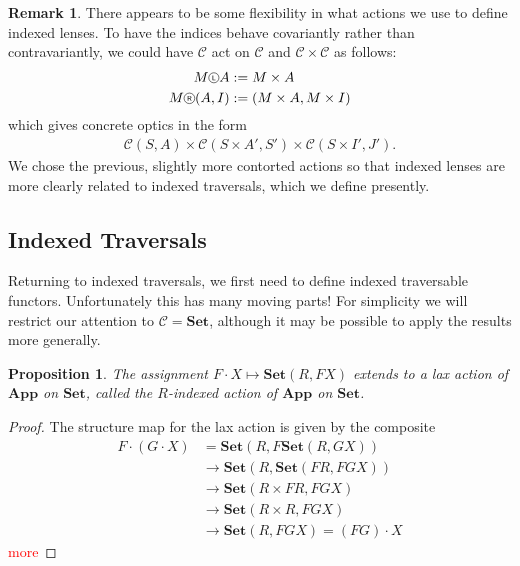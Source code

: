 \documentclass[11pt,letterpaper]{article}
\theoremstyle{plain}
\newtheorem{proposition}[theorem]{Proposition}
\theoremstyle{definition}
\newtheorem{remark}[theorem]{Remark}
\newcommand{\C}{\mathscr{C}}
\newcommand{\Set}{\mathbf{Set}}
\newcommand{\App}{\mathbf{App}}
\newcommand{\Optic}{\mathbf{Optic}}
\newcommand{\act}{\cdot}
\newcommand*\circled[1]{\tikz[baseline={([yshift=-0.65ex]current bounding box.center)}]{
   \node[shape=circle,draw,inner sep=1pt] (char) {#1};}}
\newcommand{\actL}{{\circled{\tiny$\mathsf{L}$}}}
\newcommand{\actR}{{\circled{\tiny$\mathsf{R}$}}}
\newcommand{\todo}[1]{\textcolor{red}{\small #1}}
\begin{document}
\begin{remark}
There appears to be some flexibility in what actions we use to define indexed lenses. To have the indices behave covariantly rather than contravariantly, we could have $\C$ act on $\C$ and $\C \times \C$ as follows:
\begin{align*}
M \actL A &:= M \times A \\
M \actR (A, I) &:= (M \times A, M \times I)
\end{align*}
which gives concrete optics in the form
\begin{align*}
\C(S, A) \times \C(S \times A', S') \times \C(S \times I', J').
\end{align*}
We chose the previous, slightly more contorted actions so that indexed lenses are more clearly related to indexed traversals, which we define presently.
\end{remark}

\subsection{Indexed Traversals}

Returning to indexed traversals, we first need to define indexed traversable functors. Unfortunately this has many moving parts! For simplicity we will restrict our attention to $\C = \Set$, although it may be possible to apply the results more generally.

\begin{proposition}
The assignment $F \act X \mapsto \Set(R, FX)$ extends to a lax action of $\App$ on $\Set$, called the \emph{$R$-indexed action of $\App$ on $\Set$}.
\end{proposition}
\begin{proof}
The structure map for the lax action is given by the composite
\begin{align*}
F \act (G \act X) &= \Set(R, F\Set(R, GX)) \\
&\to \Set(R, \Set(FR, FGX)) \\
&\to \Set(R \times FR, FGX) \\
&\to \Set(R \times R, FGX) \\
&\to \Set(R, FGX) = (FG) \act X
\end{align*}
\todo{more}
\end{proof}
\end{document}

